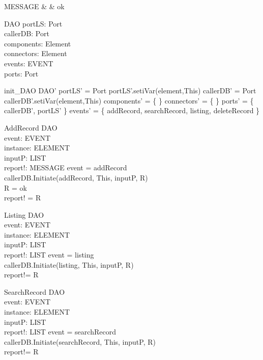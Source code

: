 \begin{zed}
MESSAGE & \ddef & ok 
\end{zed}

\begin{schema}{DAO}
portLS:  Port \\
callerDB: Port \\
components: \pset Element \\
connectors: \pset Element \\
events: \pset EVENT \\
ports: \pset Port
\end{schema}

\begin{zed}
init\_DAO \sdef \lsch 
DAO' \bbar 
portLS' = \new Port 
\land portLS'.setiVar(element,This) 
\land callerDB' = \new Port 
\land callerDB'.setiVar(element,This) 
\land components' = \{ \}
\land connectors' = \{  \}
\land ports' = \{ callerDB', portLS' \}  
\land events' = \{ addRecord, searchRecord, listing, deleteRecord \}
\rsch \end{zed}


\begin{schema}{AddRecord}
\Delta DAO \\
event: EVENT \\
instance: ELEMENT \\
inputP: LIST \\
report!: MESSAGE
\where event = addRecord \\
callerDB.Initiate(addRecord, This, inputP, R) \\
R = ok \\ 
report! = R
\end{schema}

\begin{schema}{Listing}
\Delta DAO \\
event: EVENT \\
instance: ELEMENT \\
inputP: LIST \\
report!: LIST
\where event = listing \\
callerDB.Initiate(listing, This, inputP, R) \\
report!= R
\end{schema}

\begin{schema}{SearchRecord}
\Delta DAO \\
event: EVENT \\
instance: ELEMENT \\
inputP: LIST \\
report!: LIST
\where event = searchRecord \\
callerDB.Initiate(searchRecord, This, inputP, R) \\
report!= R
\end{schema}

